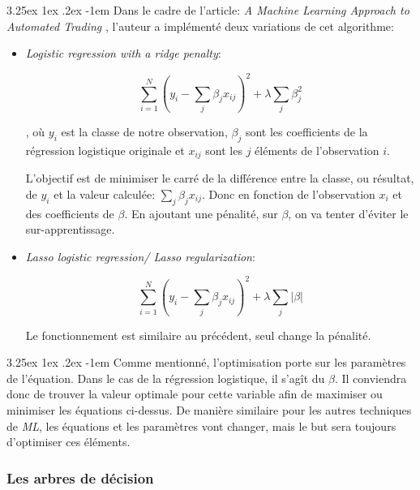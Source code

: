 \documentclass[a4paper, 11pt]{article}
\makeatletter
\renewcommand\paragraph{\@startsection{paragraph}{5}{\z@}%
  {3.25ex \@plus1ex \@minus.2ex}%
  {-1em}%
  {\normalfont\normalsize\bfseries}}
\makeatother
\begin{document}
\paragraph{}
Dans le cadre de l'article: \textit{A Machine Learning Approach to Automated Trading} \cite{machine_learning_automated_trading}, 
l'auteur a implémenté deux variations de cet algorithme:
\begin{itemize}
\item \textit{Logistic regression with a ridge penalty}:
\begin{center}
$$\sum_{i=1}^N (y_i - \sum_j\beta_j x_{ij})^2 + \lambda \sum_j \beta_j^2$$
\end{center}
, où $y_i$ est la classe de notre observation, $\beta_j$ sont les coefficients de la régression logistique originale \cite{machine_learning_automated_trading} et $x_{ij}$
sont les $j$ éléments de l'observation $i$.

L'objectif est de minimiser le carré de la différence entre la classe, ou résultat, de $y_i$ et la valeur 
calculée: $\sum\limits_j\beta_j x_{ij}$. Donc en fonction de l'observation $x_i$ et des coefficients de $\beta$.
En ajoutant une pénalité, sur $\beta$, on va tenter d'éviter le sur-apprentissage.

\item \textit{Lasso logistic regression/ Lasso regularization}:
\begin{center}
$$\sum_{i=1}^N (y_i - \sum_j\beta_j x_{ij})^2 + \lambda \sum_j |\beta|$$
\end{center}
Le fonctionnement est similaire au précédent, seul change la pénalité.

\end{itemize}

\paragraph{}
Comme mentionné, l'optimisation porte sur les paramètres de l'équation. Dans le cas de la régression logistique, 
il s'agît du $\beta$. Il conviendra donc de trouver la valeur optimale pour cette variable afin de maximiser ou minimiser 
les équations ci-dessus. De manière similaire pour les autres techniques de \textit{ML}, 
les équations et les paramètres vont changer, mais  le but sera toujours d'optimiser ces éléments. 

\subsubsection{Les arbres de décision}\label{section arbre de décision}
\end{document}

